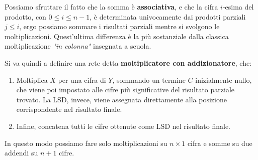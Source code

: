 \documentclass[a4paper,11pt]{article}
\begin{document}
Possiamo sfruttare il fatto che la somma è \textbf{associativa}, e che la cifra $i$-esima del prodotto, con $0 \leq i \leq n - 1$, è determinata univocamente dai prodotti parziali $j \leq i$, ergo possiamo sommare i risultati parziali mentre si svolgono le moltiplicazioni. 
Quest'ultima differenza è la più sostanziale dalla classica moltiplicazione \textit{"in colonna"} insegnata a scuola.

Si va quindi a definire una rete detta \textbf{moltiplicatore con addizionatore}, che:
\begin{enumerate}
	\item Moltiplica $X$ per una cifra di $Y$, sommando un termine $C$ inizialmente nullo, che viene poi impostato alle cifre più significative del risultato parziale trovato.
		La LSD, invece, viene assegnata direttamente alla posizione corrispondente nel risultato finale.
	\item Infine, concatena tutti le cifre ottenute come LSD nel risultato finale.
\end{enumerate}

In questo modo possiamo fare solo moltiplicazioni su $n \times 1$ cifra e somme su due addendi su $n+1$ cifre.
\end{document}
